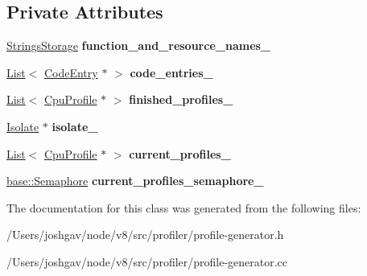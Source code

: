 \subsection*{Private Attributes}
\begin{DoxyCompactItemize}
\item 
\hyperlink{classv8_1_1internal_1_1_strings_storage}{Strings\+Storage} {\bfseries function\+\_\+and\+\_\+resource\+\_\+names\+\_\+}\hypertarget{classv8_1_1internal_1_1_cpu_profiles_collection_a115787029d519fd3685c4cc7558d87be}{}\label{classv8_1_1internal_1_1_cpu_profiles_collection_a115787029d519fd3685c4cc7558d87be}

\item 
\hyperlink{classv8_1_1internal_1_1_list}{List}$<$ \hyperlink{classv8_1_1internal_1_1_code_entry}{Code\+Entry} $\ast$ $>$ {\bfseries code\+\_\+entries\+\_\+}\hypertarget{classv8_1_1internal_1_1_cpu_profiles_collection_acadf4f32dd15ba0167e53e7ea6a06ae0}{}\label{classv8_1_1internal_1_1_cpu_profiles_collection_acadf4f32dd15ba0167e53e7ea6a06ae0}

\item 
\hyperlink{classv8_1_1internal_1_1_list}{List}$<$ \hyperlink{classv8_1_1internal_1_1_cpu_profile}{Cpu\+Profile} $\ast$ $>$ {\bfseries finished\+\_\+profiles\+\_\+}\hypertarget{classv8_1_1internal_1_1_cpu_profiles_collection_a6ee03562316d9d4fc963d384250457c9}{}\label{classv8_1_1internal_1_1_cpu_profiles_collection_a6ee03562316d9d4fc963d384250457c9}

\item 
\hyperlink{classv8_1_1internal_1_1_isolate}{Isolate} $\ast$ {\bfseries isolate\+\_\+}\hypertarget{classv8_1_1internal_1_1_cpu_profiles_collection_a0888b68a083883cd09c847444f1f45b2}{}\label{classv8_1_1internal_1_1_cpu_profiles_collection_a0888b68a083883cd09c847444f1f45b2}

\item 
\hyperlink{classv8_1_1internal_1_1_list}{List}$<$ \hyperlink{classv8_1_1internal_1_1_cpu_profile}{Cpu\+Profile} $\ast$ $>$ {\bfseries current\+\_\+profiles\+\_\+}\hypertarget{classv8_1_1internal_1_1_cpu_profiles_collection_a0cd0319450c23de667dfcdfc12818ff6}{}\label{classv8_1_1internal_1_1_cpu_profiles_collection_a0cd0319450c23de667dfcdfc12818ff6}

\item 
\hyperlink{classv8_1_1base_1_1_semaphore}{base\+::\+Semaphore} {\bfseries current\+\_\+profiles\+\_\+semaphore\+\_\+}\hypertarget{classv8_1_1internal_1_1_cpu_profiles_collection_ad6d709824b056793abd3432b49d892cd}{}\label{classv8_1_1internal_1_1_cpu_profiles_collection_ad6d709824b056793abd3432b49d892cd}

\end{DoxyCompactItemize}


The documentation for this class was generated from the following files\+:\begin{DoxyCompactItemize}
\item 
/\+Users/joshgav/node/v8/src/profiler/profile-\/generator.\+h\item 
/\+Users/joshgav/node/v8/src/profiler/profile-\/generator.\+cc\end{DoxyCompactItemize}
